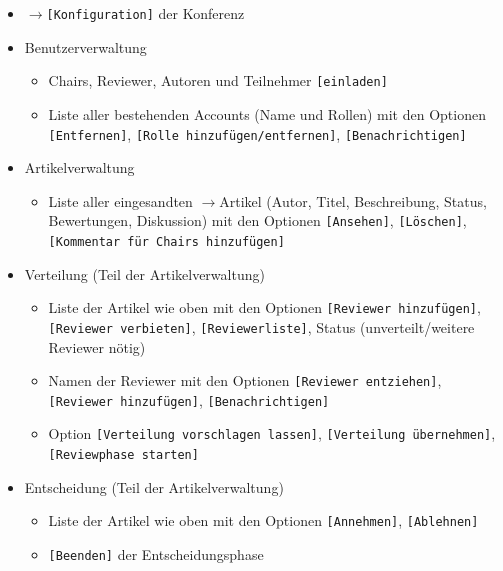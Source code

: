 \documentclass[headexclude,footexclude,12pt,BCOR0pt,DIV15]{scrartcl}
\begin{document}
        \begin{itemize}
            \item $\rightarrow$\texttt{[Konfiguration]} der Konferenz
            \item Benutzerverwaltung
            \begin{itemize}
                \item Chairs, Reviewer, Autoren und Teilnehmer \texttt{[einladen]}
                \item Liste aller bestehenden Accounts (Name und Rollen) mit den Optionen
                    \texttt{[Entfernen]}, \texttt{[Rolle hinzuf\"{u}gen/entfernen]}, \texttt{[Benachrichtigen]}
            \end{itemize}
            \item Artikelverwaltung
            \begin{itemize}
                \item Liste aller eingesandten $\rightarrow$Artikel (Autor, Titel, Beschreibung, Status, Bewertungen, Diskussion)
                    mit den Optionen \texttt{[Ansehen]}, \texttt{[L\"{o}schen]}, \texttt{[Kommentar f\"{u}r Chairs hinzuf\"{u}gen]}
            \end{itemize}
            \item Verteilung (Teil der Artikelverwaltung)
            \begin{itemize}
                \item Liste der Artikel wie oben mit den Optionen \texttt{[Reviewer hinzuf\"{u}gen]}, \texttt{[Reviewer verbieten]},
                    \texttt{[Reviewerliste]}, Status (unverteilt/weitere Reviewer n\"{o}tig)
                \item Namen der Reviewer mit den Optionen \texttt{[Reviewer entziehen]}, \texttt{[Reviewer hinzuf\"{u}gen]}, \texttt{[Benachrichtigen]}
                \item Option \texttt{[Verteilung vorschlagen lassen]}, \texttt{[Verteilung \"{u}bernehmen]}, \texttt{[Reviewphase starten]}
            \end{itemize}
            \item Entscheidung (Teil der Artikelverwaltung)
            \begin{itemize}
                \item Liste der Artikel wie oben mit den Optionen \texttt{[Annehmen]}, \texttt{[Ablehnen]}
                \item \texttt{[Beenden]} der Entscheidungsphase
            \end{itemize}
        \end{itemize}
\end{document}
